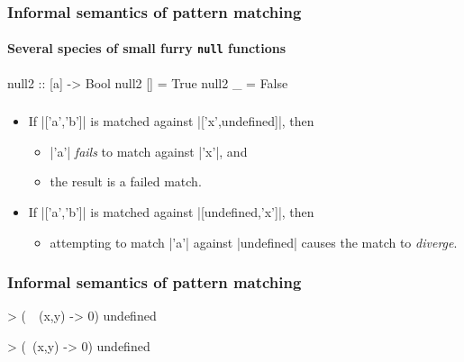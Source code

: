 \documentclass{beamer}
\begin{document}
\begin{frame}[fragile]
  \frametitle{Informal semantics of pattern matching}
  \framesubtitle{Several species of small furry \texttt{null} functions}

  \begin{code}
null2 :: [a] -> Bool
null2 []    = True
null2 _     = False
  \end{code}
\end{frame}


\begin{frame}[fragile]
  \frametitle{}

  \begin{examples}
    \begin{itemize}
    \item<1->
      If |['a','b']| is matched against |['x',undefined]|, then
      \begin{itemize}
      \item<2->
        |'a'| \emph{fails} to match against |'x'|, and
      \item<2->
        the result is a failed match.
      \end{itemize}
    \item<1->
      If |['a','b']| is matched against |[undefined,'x']|, then
      \begin{itemize}
      \item<2->
        attempting to match |'a'| against |undefined| causes the match
        to \emph{diverge}.
      \end{itemize}
    \end{itemize}
  \end{examples}
\end{frame}


\begin{frame}[fragile]
  \frametitle{Informal semantics of pattern matching}

  \begin{example}
    \begin{code}
> (\ ~(x,y) -> 0) undefined

> (\  (x,y) -> 0) undefined

    \end{code}
  \end{example}
\end{frame}
\end{document}
